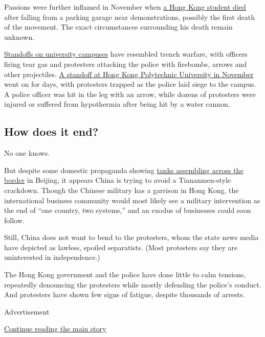 Passions were further inflamed in November when
\href{https://www.nytimes3xbfgragh.onion/2019/11/07/world/asia/hong-kong-protest-student-dies.html}{a
Hong Kong student died} after falling from a parking garage near
demonstrations, possibly the first death of the movement. The exact
circumstances surrounding his death remain unknown.

\href{https://www.nytimes3xbfgragh.onion/2019/11/11/world/asia/hong-kong-protests-shooting.html}{Standoffs
on university campuses} have resembled trench warfare, with officers
firing tear gas and protesters attacking the police with firebombs,
arrows and other projectiles.
\href{https://www.nytimes3xbfgragh.onion/2019/11/17/world/asia/hong-kong-protests-chinese-soldiers.html}{A
standoff at Hong Kong Polytechnic University in November} went on for
days, with protesters trapped as the police laid siege to the campus. A
police officer was hit in the leg with an arrow, while dozens of
protesters were injured or suffered from hypothermia after being hit by
a water cannon.

\hypertarget{how-does-it-end}{%
\subsection{How does it end?}\label{how-does-it-end}}

No one knows.

But despite some domestic propaganda showing
\href{https://www.nytimes3xbfgragh.onion/2019/08/19/world/asia/hong-kong-china-troops.html}{tanks
assembling across the border} in Beijing, it appears China is trying to
avoid a Tiananmen-style crackdown. Though the Chinese military has a
garrison in Hong Kong, the international business community would most
likely see a military intervention as the end of ``one country, two
systems,'' and an exodus of businesses could soon follow.

Still, China does not want to bend to the protesters, whom the state
news media have depicted as lawless, spoiled separatists. (Most
protesters say they are uninterested in independence.)

The Hong Kong government and the police have done little to calm
tensions, repeatedly denouncing the protesters while mostly defending
the police's conduct. And protesters have shown few signs of fatigue,
despite thousands of arrests.

Advertisement

\protect\hyperlink{after-bottom}{Continue reading the main story}

